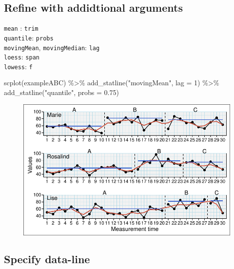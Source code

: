 \documentclass[
  letterpaper,
  DIV=11,
  numbers=noendperiod]{scrreprt}
\newenvironment{Shaded}{\begin{snugshade}}{\end{snugshade}}
\newcommand{\AttributeTok}[1]{\textcolor[rgb]{0.40,0.45,0.13}{#1}}
\newcommand{\DecValTok}[1]{\textcolor[rgb]{0.68,0.00,0.00}{#1}}
\newcommand{\FloatTok}[1]{\textcolor[rgb]{0.68,0.00,0.00}{#1}}
\newcommand{\FunctionTok}[1]{\textcolor[rgb]{0.28,0.35,0.67}{#1}}
\newcommand{\NormalTok}[1]{\textcolor[rgb]{0.00,0.23,0.31}{#1}}
\newcommand{\SpecialCharTok}[1]{\textcolor[rgb]{0.37,0.37,0.37}{#1}}
\newcommand{\StringTok}[1]{\textcolor[rgb]{0.13,0.47,0.30}{#1}}
\begin{document}
\hypertarget{refine-with-addidtional-arguments}{%
\subsection{Refine with addidtional
arguments}\label{refine-with-addidtional-arguments}}

\texttt{mean} : \texttt{trim}\\
\texttt{quantile}: \texttt{probs}\\
\texttt{movingMean}, \texttt{movingMedian}: \texttt{lag}\\
\texttt{loess}: \texttt{span}\\
\texttt{lowess}: \texttt{f}

\begin{Shaded}
\begin{Highlighting}[]
\FunctionTok{scplot}\NormalTok{(exampleABC) }\SpecialCharTok{\%\textgreater{}\%}
  \FunctionTok{add\_statline}\NormalTok{(}\StringTok{"movingMean"}\NormalTok{, }\AttributeTok{lag =} \DecValTok{1}\NormalTok{) }\SpecialCharTok{\%\textgreater{}\%}
  \FunctionTok{add\_statline}\NormalTok{(}\StringTok{"quantile"}\NormalTok{, }\AttributeTok{probs =} \FloatTok{0.75}\NormalTok{)}
\end{Highlighting}
\end{Shaded}

\begin{figure}[H]

{\centering \includegraphics{./ch_scplot_files/figure-pdf/scplot-statline-5-1.pdf}

}

\end{figure}

\hypertarget{specify-data-line}{%
\subsection{Specify data-line}\label{specify-data-line}}
\end{document}

